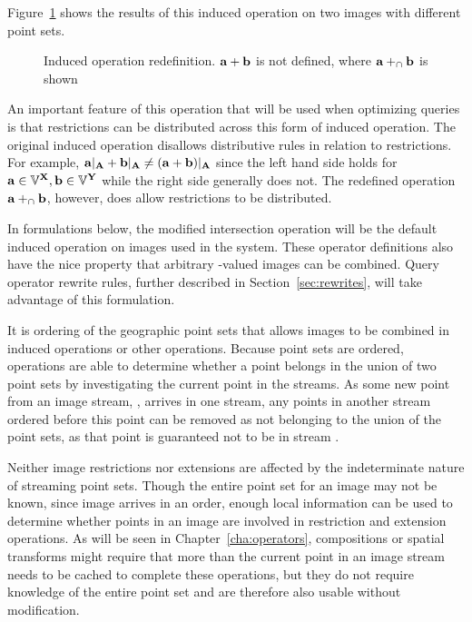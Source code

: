\documentclass{ucdthesis}       %
\begin{document}
Figure~\ref{fig:cap} shows the results of this induced operation on
two images with different point sets.

\begin{figure}[htb]
  \centering
{
  \quad
}
\caption[Induced operation redefinition]{
  Induced operation redefinition.  ${\bf{a}}+{\bf{b}}$ is not defined,
  where ${\bf{a}} +_\cap {\ensuremath{\bf{b}}}$ is shown}
\label{fig:cap}
\end{figure}

An important feature of this operation that will be used when
optimizing queries is that restrictions can be distributed across
this form of induced operation.  The original induced operation
disallows distributive rules in relation to restrictions. For example,
${\bf{a}}|_{\bf{A}} + {\bf{b}}|_{\bf{A}} \ne ({\bf{a}}+{\bf{b}})|_{\bf{A}}$ since
the left hand side holds for ${\bf{a}} \in {\ensuremath{\mathbb{V}}}^{{\bf{X}}}, {\bf{b}} \in
{\ensuremath{\mathbb{V}}}^{{\bf{Y}}}$ while the right side generally does not.  The redefined
operation ${\bf{a}} +_\cap {\ensuremath{\bf{b}}}$, however, does allow restrictions to
be distributed.  

In formulations below, the modified intersection operation
will be the default induced operation on images used in the system.
These operator definitions also have the nice property that arbitrary
-valued images can be combined.  Query operator rewrite rules,
further described in Section~\ref{sec:rewrites}, will take advantage
of this formulation.

It is ordering of the geographic point sets that allows images to
be combined in induced operations or other operations.  Because point
sets are ordered, operations are able to determine whether a point
belongs in the union of two point sets by investigating the current
point in the streams.  As some new point from an image stream, ,
arrives in one stream, any points in another stream ordered before
this point can be removed as not belonging to the union of the point
sets, as that point is guaranteed not to be in stream .

Neither image restrictions nor extensions are affected by the
indeterminate nature of streaming point sets.  Though the entire point
set for an image may not be known, since image arrives in an order,
enough local information can be used to determine whether points in an
image are involved in restriction and extension operations.  As will
be seen in Chapter~\ref{cha:operators}, compositions or spatial
transforms might require that more than the current point in an image
stream needs to be cached to complete these operations, but they do not
require knowledge of the entire point set and are therefore also
usable without modification.
\end{document}
